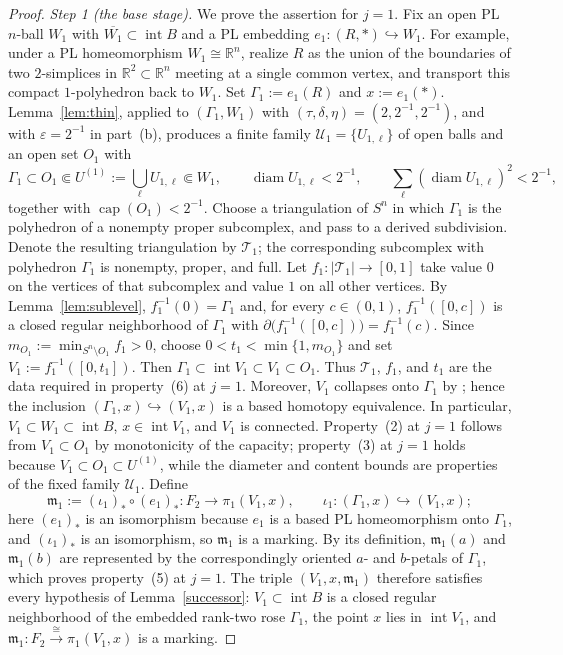 \documentclass[12pt,oneside,a4paper]{article}
\theoremstyle{mytheorem}
\theoremstyle{remark}
\theoremstyle{definition}
\begin{document}
\begin{proof}
\smallskip\noindent\emph{Step 1 (the base stage).}
We prove the assertion for $j=1$.
Fix an open PL $n$-ball $W_1$ with $\overline{W_1}\subset\operatorname{int}B$
and a PL embedding $e_1:(R,*)\hookrightarrow W_1$.  For example, under
a PL homeomorphism $W_1\cong\mathbb R^n$, realize $R$ as the union of
the boundaries of two $2$-simplices in
$\mathbb R^2\subset\mathbb R^n$ meeting at a single common vertex, and
transport this compact $1$-polyhedron back to $W_1$.  Set
$\Gamma_1:=e_1(R)$ and $x:=e_1(*)$.
Lemma~\ref{lem:thin}, applied to $(\Gamma_1,W_1)$ with
$(\tau,\delta,\eta)=(2,2^{-1},2^{-1})$, and with
$\varepsilon=2^{-1}$ in part~\textup{(b)}, produces a finite family
$\mathcal{U}_1=\{U_{1,\ell}\}$ of open balls and an open set $O_1$ with
\[
\Gamma_1\subset O_1\Subset U^{(1)}:=\bigcup_\ell U_{1,\ell}\Subset W_1,
\qquad
\operatorname{diam}U_{1,\ell}<2^{-1},
\qquad
\sum_\ell(\operatorname{diam}U_{1,\ell})^{2}<2^{-1},
\]
together with $\operatorname{cap}(O_1)<2^{-1}$.  Choose a triangulation
of $S^n$ in which $\Gamma_1$ is the polyhedron of a nonempty proper
subcomplex, and pass to a derived subdivision.  Denote the resulting
triangulation by $\mathcal{T}_1$; the corresponding subcomplex with
polyhedron $\Gamma_1$ is nonempty, proper, and full.
Let
$f_1:|\mathcal{T}_1|\to[0,1]$ take value $0$ on the vertices
of that subcomplex and value $1$ on all other vertices.  By
Lemma~\ref{lem:sublevel}, $f_1^{-1}(0)=\Gamma_1$ and, for
every $c\in(0,1)$, $f_1^{-1}([0,c])$ is a closed regular neighborhood of
$\Gamma_1$ with
\(\partial\bigl(f_1^{-1}([0,c])\bigr)=f_1^{-1}(c)\).
Since $m_{O_1}:=\min_{S^n\setminus O_1}f_1>0$, choose
$0<t_1<\min\{1,m_{O_1}\}$ and set $V_1:=f_1^{-1}([0,t_1])$.  Then
$\Gamma_1\subset \operatorname{int}V_1\subset V_1\subset O_1$.
Thus $\mathcal{T}_1$, $f_1$, and $t_1$ are the data required in
property~\textup{(6)} at $j=1$.
Moreover, $V_1$ collapses onto $\Gamma_1$ by
\cite[Theorem~3.16]{zbMATH01714503}; hence the inclusion
$(\Gamma_1,x)\hookrightarrow(V_1,x)$ is a based homotopy equivalence.
In particular, $V_1\subset W_1\subset\operatorname{int}B$, $x\in\operatorname{int}V_1$,
and $V_1$ is connected.  Property~(2) at
$j=1$ follows from $V_1\subset O_1$ by monotonicity of the capacity;
property~(3) at $j=1$ holds because $V_1\subset O_1\subset U^{(1)}$, while
the diameter and content bounds are properties of the fixed family
$\mathcal{U}_1$. Define
\[
\mathfrak{m}_1:=(\iota_1)_*\circ(e_1)_*:F_2\longrightarrow\pi_1(V_1,x),
\qquad
\iota_1:(\Gamma_1,x)\hookrightarrow(V_1,x);
\]
here $(e_1)_*$ is an isomorphism because $e_1$ is a based PL homeomorphism
onto $\Gamma_1$, and $(\iota_1)_*$ is an isomorphism, so $\mathfrak{m}_1$ is
a marking.  By its definition, $\mathfrak{m}_1(a)$ and
$\mathfrak{m}_1(b)$ are represented by the correspondingly oriented
$a$- and $b$-petals of $\Gamma_1$, which proves property~\textup{(5)} at
$j=1$.  The triple $(V_1,x,\mathfrak{m}_1)$ therefore satisfies every hypothesis of
Lemma~\ref{successor}: $V_1\subset\operatorname{int}B$ is a closed regular neighborhood of the
embedded rank-two rose $\Gamma_1$, the point $x$ lies in
$\operatorname{int}V_1$, and $\mathfrak{m}_1:F_2\xrightarrow{\cong}\pi_1(V_1,x)$
is a marking.


\end{proof}
\end{document}
